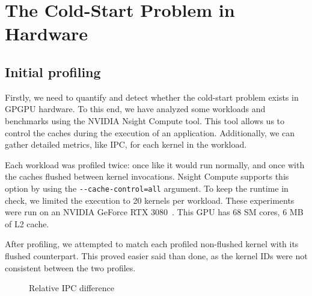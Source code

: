 \chapter{The Cold-Start Problem in Hardware}\label{ch:hw-analysis}

\section{Initial profiling}\label{sec:initial-profiling}
Firstly, we need to quantify and detect whether the cold-start problem exists in GPGPU hardware.
To this end, we have analyzed some workloads and benchmarks using the NVIDIA Nsight Compute tool.
This tool allows us to control the caches during the execution of an application.
Additionally, we can gather detailed metrics, like IPC, for each kernel in the workload.

Each workload was profiled twice: once like it would run normally, and once with the caches flushed between kernel invocations.
Nsight Compute supports this option by using the \verb|--cache-control=all| argument.
To keep the runtime in check, we limited the execution to 20 kernels per workload.
These experiments were run on an NVIDIA GeForce RTX 3080~\cite{nvidia-wp}.
This GPU has 68 SM cores, 6 MB of L2 cache.

After profiling, we attempted to match each profiled non-flushed kernel with its flushed counterpart.
This proved easier said than done, as the kernel IDs were not consistent between the two profiles.

\begin{figure}
    \centering
    \caption{Relative IPC difference}
    \label{fig:ipc_diff}
\end{figure}


